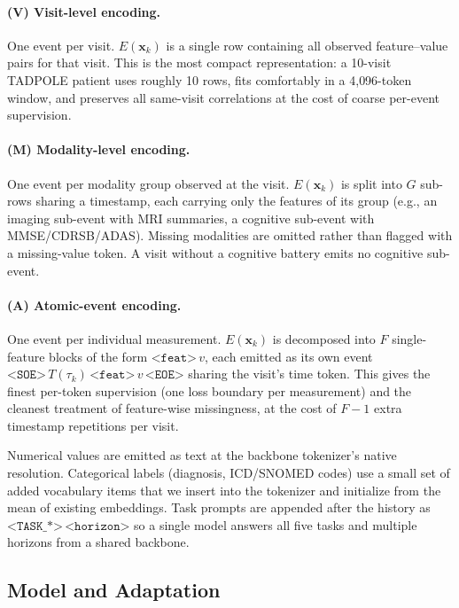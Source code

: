 \documentclass{article}
\newcommand{\soe}{\texttt{<SOE>}}
\newcommand{\eoe}{\texttt{<EOE>}}
\newcommand{\ttoken}[1]{\texttt{<#1>}}
\begin{document}
\paragraph{(V) Visit-level encoding.}
One event per visit.
$E(\mathbf{x}_k)$ is a single row containing all observed feature--value pairs for that visit.
This is the most compact representation: a 10-visit TADPOLE patient uses roughly 10 rows, fits comfortably in a 4{,}096-token window, and preserves all same-visit correlations at the cost of coarse per-event supervision.

\paragraph{(M) Modality-level encoding.}
One event per modality group observed at the visit.
$E(\mathbf{x}_k)$ is split into $G$ sub-rows sharing a timestamp, each carrying only the features of its group (e.g., an imaging sub-event with MRI summaries, a cognitive sub-event with MMSE/CDRSB/ADAS).
Missing modalities are omitted rather than flagged with a missing-value token. A visit without a cognitive battery emits no cognitive sub-event.

\paragraph{(A) Atomic-event encoding.}
One event per individual measurement.
$E(\mathbf{x}_k)$ is decomposed into $F$ single-feature blocks of the form $\ttoken{feat}\,v$, each emitted as its own event $\soe\,T(\tau_k)\,\ttoken{feat}\,v\,\eoe$ sharing the visit's time token.
This gives the finest per-token supervision (one loss boundary per measurement) and the cleanest treatment of feature-wise missingness, at the cost of $F{-}1$ extra timestamp repetitions per visit.

Numerical values are emitted as text at the backbone tokenizer's native resolution. Categorical labels (diagnosis, ICD/SNOMED codes) use a small set of added vocabulary items that we insert into the tokenizer and initialize from the mean of existing embeddings.
Task prompts are appended after the history as $\ttoken{TASK\_*} \, \ttoken{horizon}$ so a single model answers all five tasks and multiple horizons from a shared backbone.

\subsection{Model and Adaptation}
\label{sec:model}
\end{document}
